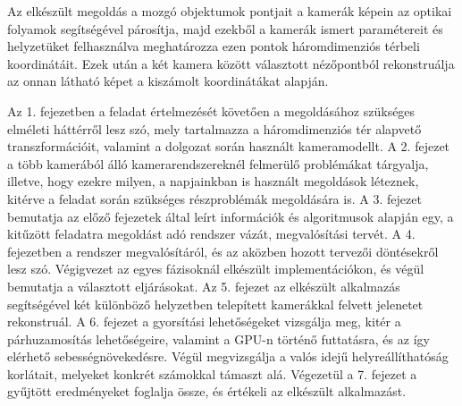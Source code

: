 {\color{blue}

Az elkészült megoldás a mozgó objektumok pontjait a kamerák képein az optikai folyamok segítségével párosítja, majd ezekből a kamerák ismert paramétereit és helyzetüket felhasználva meghatározza ezen pontok háromdimenziós térbeli koordinátáit. Ezek után a két kamera között választott nézőpontból rekonstruálja az onnan látható képet a kiszámolt koordinátákat alapján.

Az 1. fejezetben a feladat értelmezését követően a megoldásához szükséges elméleti háttérről lesz szó, mely tartalmazza a háromdimenziós tér alapvető transzformációit, valamint a dolgozat során használt kameramodellt. A 2. fejezet a több kamerából álló kamerarendszereknél felmerülő problémákat tárgyalja, illetve, hogy ezekre milyen, a napjainkban is használt megoldások léteznek, kitérve a feladat során szükséges részproblémák megoldására is. A 3. fejezet bemutatja az előző fejezetek által leírt információk és algoritmusok alapján egy, a kitűzött feladatra megoldást adó rendszer vázát, megvalósítási tervét. A 4. fejezetben a rendszer megvalósítáról, és az aközben hozott tervezői döntésekről lesz szó. Végigvezet az egyes fázisoknál elkészült implementációkon, és végül bemutatja a választott eljárásokat. Az 5. fejezet az elkészült alkalmazás segítségével két különböző helyzetben telepített kamerákkal felvett jelenetet rekonstruál. A 6. fejezet a gyorsítási lehetőségeket vizsgálja meg, kitér a párhuzamosítás lehetőségeire, valamint a GPU-n történő futtatásra, és az így elérhető sebességnövekedésre. Végül megvizsgálja a valós idejű helyreállíthatóság korlátait, melyeket konkrét számokkal támaszt alá. Végezetül a 7. fejezet a gyűjtött eredményeket foglalja össze, és értékeli az elkészült alkalmazást.

}